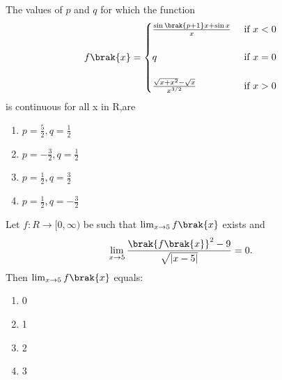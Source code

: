     \item The values of $p$ and $q$ for which the function 
     \[ f\brak{x} = \begin{cases}
  \frac{\sin\brak{p+1}x+\sin x}{x} & \text{ if $ x<0 $}\\\\
  q & \text{ if $ x = 0 $}\\\\
  \frac{\sqrt{x+x^2}-\sqrt{x}}{x^{3/2}} & \text{ if $ x> 0 $}
  \end{cases}
  \]
    is  continuous for all x in R,are \hfill{}
     \begin{multicols}{2}
         \begin{enumerate}
       \item $p=\frac{5}{2}, q =\frac{1}{2}$
       \item $p=-\frac{3}{2}, q=\frac{1}{2}$
       \item $p=\frac{1}{2}, q = \frac{3}{2}$
       \item $p=\frac{1}{2}, q = -\frac{3}{2}$
     \end{enumerate}
     \end{multicols}
     
    \item Let $f:R \to [0,\infty)$ be such that $\lim_{x\to 5} f\brak{x}$ exists and \[ \lim_{x\to 5} \frac{\brak{f\brak{x}}^2-9}{\sqrt{\lvert x-5\rvert}}=0.\]Then $ \lim_{x\to 5} f\brak{x}$ equals:
     \begin{multicols}{4}
         \begin{enumerate}
     \item 0\item1\item2\item3
     \end{enumerate}
     \end{multicols}
     
